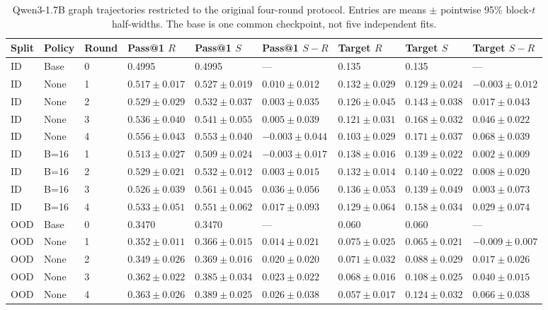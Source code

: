 \begin{table}[H]
\caption{Qwen3-1.7B graph trajectories restricted to the original four-round protocol. Entries are means $\pm$ pointwise 95\% block-$t$ half-widths. The base is one common checkpoint, not five independent fits.}
\label{tab:qwen-rounds}
\centering\small\setlength{\tabcolsep}{3pt}
\begin{tabular}{@{}lllllllll@{}}
\toprule
Split & Policy & Round & Pass@1 $R$ & Pass@1 $S$ & Pass@1 $S-R$ & Target $R$ & Target $S$ & Target $S-R$\\
\midrule
ID & Base & 0 & 0.4995 & 0.4995 & --- & 0.135 & 0.135 & ---\\
ID & None & 1 & $0.517\pm0.017$ & $0.527\pm0.019$ & $0.010\pm0.012$ & $0.132\pm0.029$ & $0.129\pm0.024$ & $-0.003\pm0.012$\\
ID & None & 2 & $0.529\pm0.029$ & $0.532\pm0.037$ & $0.003\pm0.035$ & $0.126\pm0.045$ & $0.143\pm0.038$ & $0.017\pm0.043$\\
ID & None & 3 & $0.536\pm0.040$ & $0.541\pm0.055$ & $0.005\pm0.039$ & $0.121\pm0.031$ & $0.168\pm0.032$ & $0.046\pm0.022$\\
ID & None & 4 & $0.556\pm0.043$ & $0.553\pm0.040$ & $-0.003\pm0.044$ & $0.103\pm0.029$ & $0.171\pm0.037$ & $0.068\pm0.039$\\
ID & B=16 & 1 & $0.513\pm0.027$ & $0.509\pm0.024$ & $-0.003\pm0.017$ & $0.138\pm0.016$ & $0.139\pm0.022$ & $0.002\pm0.009$\\
ID & B=16 & 2 & $0.529\pm0.021$ & $0.532\pm0.012$ & $0.003\pm0.015$ & $0.132\pm0.014$ & $0.140\pm0.022$ & $0.008\pm0.020$\\
ID & B=16 & 3 & $0.526\pm0.039$ & $0.561\pm0.045$ & $0.036\pm0.056$ & $0.136\pm0.053$ & $0.139\pm0.049$ & $0.003\pm0.073$\\
ID & B=16 & 4 & $0.533\pm0.051$ & $0.551\pm0.062$ & $0.017\pm0.093$ & $0.129\pm0.064$ & $0.158\pm0.034$ & $0.029\pm0.074$\\
OOD & Base & 0 & 0.3470 & 0.3470 & --- & 0.060 & 0.060 & ---\\
OOD & None & 1 & $0.352\pm0.011$ & $0.366\pm0.015$ & $0.014\pm0.021$ & $0.075\pm0.025$ & $0.065\pm0.021$ & $-0.009\pm0.007$\\
OOD & None & 2 & $0.349\pm0.026$ & $0.369\pm0.016$ & $0.020\pm0.020$ & $0.071\pm0.032$ & $0.088\pm0.029$ & $0.017\pm0.026$\\
OOD & None & 3 & $0.362\pm0.022$ & $0.385\pm0.034$ & $0.023\pm0.022$ & $0.068\pm0.016$ & $0.108\pm0.025$ & $0.040\pm0.015$\\
OOD & None & 4 & $0.363\pm0.026$ & $0.389\pm0.025$ & $0.026\pm0.038$ & $0.057\pm0.017$ & $0.124\pm0.032$ & $0.066\pm0.038$\\

\end{tabular}
\end{table}
